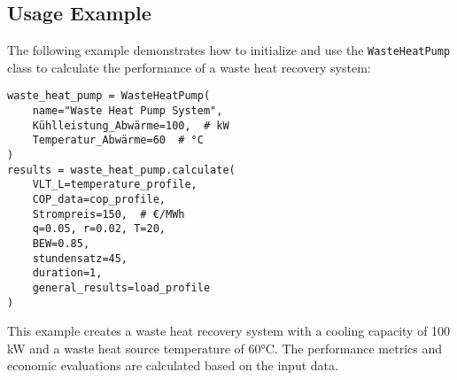 \subsection{Usage Example}
The following example demonstrates how to initialize and use the \texttt{WasteHeatPump} class to calculate the performance of a waste heat recovery system:

\begin{verbatim}
waste_heat_pump = WasteHeatPump(
    name="Waste Heat Pump System",
    Kühlleistung_Abwärme=100,  # kW
    Temperatur_Abwärme=60  # °C
)
results = waste_heat_pump.calculate(
    VLT_L=temperature_profile, 
    COP_data=cop_profile, 
    Strompreis=150,  # €/MWh
    q=0.05, r=0.02, T=20, 
    BEW=0.85, 
    stundensatz=45, 
    duration=1, 
    general_results=load_profile
)
\end{verbatim}
This example creates a waste heat recovery system with a cooling capacity of 100 kW and a waste heat source temperature of 60°C. The performance metrics and economic evaluations are calculated based on the input data.